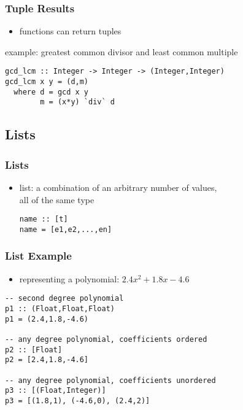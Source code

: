 \documentclass[dvipsnames]{beamer}
\theoremstyle{plain}
\begin{document}
\begin{frame}[fragile]
  \frametitle{Tuple Results}

  \begin{itemize}
    \item functions can return tuples
  \end{itemize}

  \begin{exampleblock}{example: greatest common divisor
                            and least common multiple}
    \begin{lstlisting}
gcd_lcm :: Integer -> Integer -> (Integer,Integer)
gcd_lcm x y = (d,m)
  where d = gcd x y
        m = (x*y) `div` d
    \end{lstlisting}
  \end{exampleblock}
\end{frame}

\subsection{Lists}

\begin{frame}[fragile]
  \frametitle{Lists}

  \begin{itemize}
    \item \alert{list}: a combination of an arbitrary number of values,\\
      all of the same type
    \smallskip
    \begin{lstlisting}
name :: [t]
name = [e1,e2,...,en]
    \end{lstlisting}
  \end{itemize}
\end{frame}

\begin{frame}[fragile]
  \frametitle{List Example}

  \begin{itemize}
    \item representing a polynomial: $2.4x^2 + 1.8x - 4.6$
  \end{itemize}

  \begin{lstlisting}
-- second degree polynomial
p1 :: (Float,Float,Float)
p1 = (2.4,1.8,-4.6)

-- any degree polynomial, coefficients ordered
p2 :: [Float]
p2 = [2.4,1.8,-4.6]

-- any degree polynomial, coefficients unordered
p3 :: [(Float,Integer)]
p3 = [(1.8,1), (-4.6,0), (2.4,2)]
  \end{lstlisting}
\end{frame}
\end{document}
